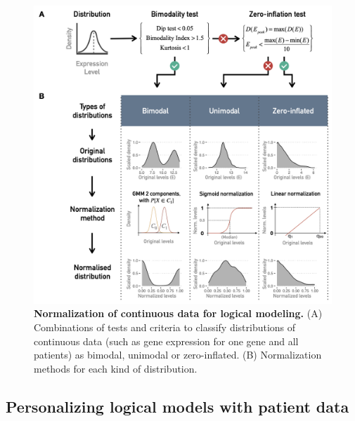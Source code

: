 \documentclass[a4paper,12pt,twoside,onecolumn,openright,final,oldfontcommands]{memoir}
\begin{document}
\begin{figure}

{\centering \includegraphics[width=0.8\linewidth]{fig/logical-processing} 

}

\caption[Normalization of continuous data for logical modeling]{\textbf{Normalization of continuous
data for logical modeling.} (A) Combinations of tests and criteria to
classify distributions of continuous data (such as gene expression for
one gene and all patients) as bimodal, unimodal or zero-inflated. (B)
Normalization methods for each kind of distribution.}\label{fig:logical-processing}
\end{figure}







\subsection{Personalizing logical models with patient
data}\label{personalizing-logical-models-with-patient-data}
\end{document}
